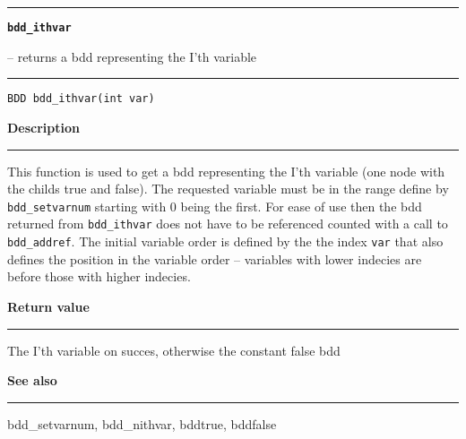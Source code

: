 \begin{minipage}{\textwidth}

\noindent\begin{minipage}{\textwidth}
\rule{\textwidth}{0.5mm}
{\tt\bf bdd\_ithvar }
\--- returns a bdd representing the I'th variable  \hspace{\fill}
\\\rule[1.5ex]{\textwidth}{0.5mm}
\end{minipage}

\noindent\begin{verbatim}
BDD bdd_ithvar(int var) 
\end{verbatim}

\vspace{\parsep}\noindent
{\bf Description}\\\rule[1.5ex]{\textwidth}{0.2mm}\vspace{-1.5ex}\setlength{\parindent}{1em}
This function is used to get a bdd representing the I'th
           variable (one node with the childs true and false). The requested
	   variable must be in the range define by {\tt
	   bdd\_setvarnum} starting with 0 being the first. For ease
	   of use then the bdd returned from {\tt bdd\_ithvar} does
	   not have to be referenced counted with a call to {\tt
	   bdd\_addref}. The initial variable order is defined by the
	   the index {\tt var} that also defines the position in the
	   variable order -- variables with lower indecies are before
	   those with higher indecies. 

\setlength{\parindent}{0em}\vspace{\parsep}\vspace{\baselineskip}\noindent
{\bf Return value}\\\rule[1.5ex]{\textwidth}{0.2mm}\vspace{-1.5ex}
The I'th variable on succes, otherwise the constant false bdd 

\vspace{\parsep}\vspace{\baselineskip}\noindent
{\bf See also}\\\rule[1.5ex]{\textwidth}{0.2mm}\vspace{-1.5ex}
bdd\_setvarnum, bdd\_nithvar, bddtrue, bddfalse 
\end{minipage}
\vspace{8ex}
